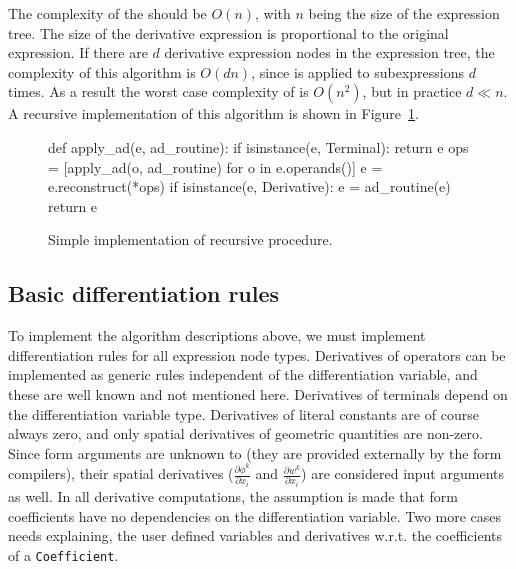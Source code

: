 The complexity of the  should be $O(n)$, with $n$
being the size of the expression tree.  The size of the derivative
expression is proportional to the original expression.  If there are
$d$ derivative expression nodes in the expression tree, the complexity
of this algorithm is $O(d n)$, since  is applied to
subexpressions $d$ times.  As a result the worst case complexity of
 is $O(n^2)$, but in practice $d \ll n$.  A recursive
implementation of this algorithm is shown in
Figure~\ref{ufl:fig:applyad}.


\begin{figure}[ht]
\begin{python}
def apply_ad(e, ad_routine):
    if isinstance(e, Terminal):
        return e
    ops = [apply_ad(o, ad_routine) for o in e.operands()]
    e = e.reconstruct(*ops)
    if isinstance(e, Derivative):
        e = ad_routine(e)
    return e
\end{python}
\caption{Simple implementation of recursive  procedure.}
\label{ufl:fig:applyad}
\end{figure}

\subsection{Basic differentiation rules}

To implement the algorithm descriptions above, we must implement
differentiation rules for all expression node types. Derivatives of
operators can be implemented as generic rules independent of the
differentiation variable, and these are well known and not mentioned
here. Derivatives of terminals depend on the differentiation variable
type.  Derivatives of literal constants are of course always zero, and
only spatial derivatives of geometric quantities are non-zero.  Since
form arguments are unknown to \ufl{} (they are provided externally by
the form compilers), their spatial derivatives ($\frac{\partial
  \phi^k}{\partial x_i}$ and $\frac{\partial w^k}{\partial x_i}$) are
considered input arguments as well.  In all derivative computations,
the assumption is made that form coefficients have no dependencies on
the differentiation variable.  Two more cases needs explaining, the
user defined variables and derivatives w.r.t. the coefficients of a
\texttt{Coefficient}.

